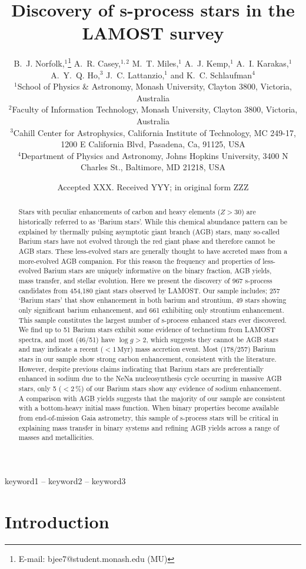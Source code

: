\documentclass[a4paper,fleqn,usenatbib]{mnras}
\title[S-process stars in LAMOST]{Discovery of s-process stars in the LAMOST survey}
\author[B.~J. Norfolk et al.]{B.~J. Norfolk,$^{1}$\thanks{E-mail: bjee7@student.monash.edu (MU)}
A.~R. Casey,$^{1,2}$
M.~T. Miles,$^{1}$
A.~J. Kemp,$^{1}$ 
A.~I. Karakas,$^{1}$\newauthor
A.~Y.~Q. Ho,$^{3}$
J.~C. Lattanzio,$^{1}$ and
K.~C. Schlaufman$^{4}$
\\
$^{1}$School of Physics \& Astronomy, Monash University, Clayton 3800, Victoria, Australia\\
$^{2}$Faculty of Information Technology, Monash University, Clayton 3800, Victoria, Australia\\
$^{3}$Cahill Center for Astrophysics, California Institute of Technology, MC 249-17, 1200 E California Blvd, Pasadena, Ca, 91125, USA\\
$^{4}$Department of Physics and Astronomy, Johns Hopkins University, 3400 N Charles St., Baltimore, MD 21218, USA
}
\date{Accepted XXX. Received YYY; in original form ZZZ}
\begin{document}
\label{firstpage}
\pagerange{\pageref{firstpage}--\pageref{lastpage}}
\maketitle

\begin{abstract}
Stars with peculiar enhancements of carbon and heavy elements ($Z > 30$) are historically referred to as `Barium stars'. While this chemical abundance pattern can be explained by thermally pulsing asymptotic giant branch (AGB) stars, many so-called Barium stars have not evolved through the red giant phase and therefore cannot be AGB stars. These less-evolved stars are generally thought to have accreted mass from a more-evolved AGB companion. For this reason the frequency and properties of less-evolved Barium stars are uniquely informative on the binary fraction, AGB yields, mass transfer, and stellar evolution. Here we present the discovery of 967 s-process candidates from 454,180 giant stars observed by LAMOST. Our sample includes; 257 `Barium stars' that show enhancement in both barium and strontium, 49 stars showing only significant barium enhancement, and 661 exhibiting only strontium enhancement. This sample constitutes the largest number of s-process enhanced stars ever discovered. We find up to 51 Barium stars exhibit some evidence of technetium from LAMOST spectra, and most (46/51) have $\log{g}>2$, which suggests they cannot be AGB stars and may indicate a recent ($<1\,\textrm{Myr}$) mass accretion event. Most (178/257) Barium stars in our sample show strong carbon enhancement, consistent with the literature. However, despite previous claims indicating that Barium stars are preferentially enhanced in sodium due to the NeNa nucleosynthesis cycle occurring in massive AGB stars, only 5 ($<2$\,\%) of our Barium stars show any evidence of sodium enhancement. A comparison with AGB yields suggests that the majority of our sample are consistent with a bottom-heavy initial mass function. When binary properties become available from end-of-mission Gaia astrometry, this sample of s-process stars will be critical in explaining mass transfer in binary systems and refining AGB yields across a range of masses and metallicities.
\end{abstract}

\begin{keywords}
keyword1 -- keyword2 -- keyword3
\end{keywords}

\section{Introduction} \label{sec:intro}
\end{document}
